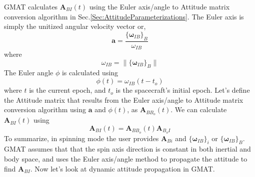 GMAT calculates $\mathbf{A}_{BI}(t)$ using the Euler axis/angle to Attitude
matrix conversion algorithm  in Sec.\ref{Sec:AttitudeParameterizations}. The
Euler axis is simply the unitized angular velocity vector or,
%
\begin{equation}
    \mathbf{a} =   \frac{  \{ \boldsymbol\omega_{IB} \}_B  }{\omega_{IB} }
\end{equation}
%
where
%
\begin{equation}
    \omega_{IB} = \| \{\boldsymbol{\omega}_{IB} \}_B \|
\end{equation}
%
\newpage
The Euler angle $\phi$ is calculated using
%
\begin{equation}
    \phi(t) = \omega_{IB}(t -t_o)
\end{equation}
%
where $t$ is the current epoch, and $t_o$ is the spacecraft's initial epoch.
Let's define the Attitude matrix that results from the Euler axis/angle to
Attitude matrix conversion algorithm using $\mathbf{a}$ and $\phi(t)$, as
$\mathbf{A}_{BB_{o}}(t)$.  We can calculate $\mathbf{A}_{BI}(t)$ using
%
\begin{equation}
    \mathbf{A}_{BI}(t) =
    \mathbf{A}_{BB_{o}}(t)\mathbf{A}_{B_{o}I}
\end{equation}
%
To summarize, in spinning mode the user provides $\mathbf{A}_{Bi}$ and
$\{ \boldsymbol\omega_{IB}\}_i$ or $\{ \boldsymbol\omega_{IB}\}_B$.  GMAT
assumes that that the spin axis direction is constant in both inertial and body
space, and uses the Euler axis/angle method to propagate the attitude to find
$\mathbf{A}_{BI}$.  Now let's look at dynamic attitude propagation in GMAT.


